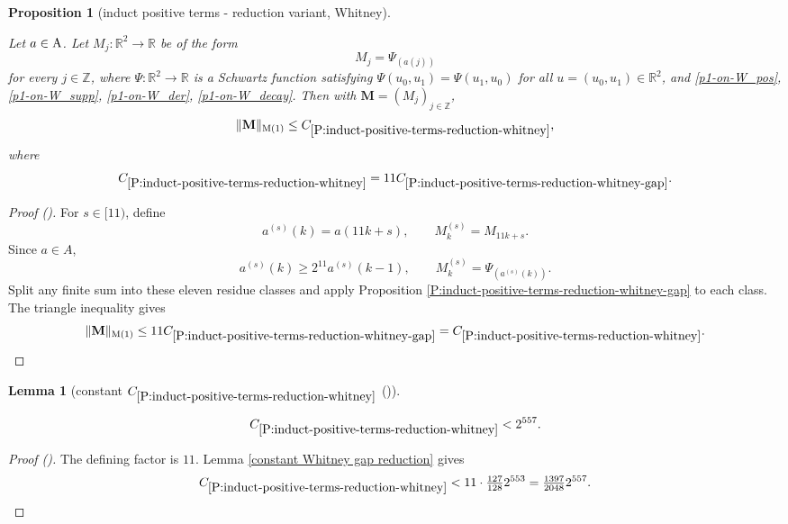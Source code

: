 \documentclass[12pt,reqno]{amsart}
\newcommand{\auto}{{({\tiny\faCar})}}
\theoremstyle{plain}
\newtheorem{lemma}[theorem]{Lemma}
\newtheorem{proposition}[theorem]{Proposition}
\numberwithin{equation}{section}
\theoremstyle{remark}
\newcommand{\uses}[1]{}
\newcommand{\usesdefs}[1]{}
\newcommand{\leanok}{}
\newcommand{\lean}[1]{}
\newcommand{\Z}{{\mathbb Z}}
\newcommand{\M}{\mathbf{M}}
\begin{document}
\begin{proposition}[induct positive terms - reduction variant, Whitney]
\label{P:induct-positive-terms-reduction-whitney}\uses{P:induct-positive-terms-reduction-whitney-gap}\usesdefs{bracket bump,multiplicatively spaced monotone sequences,auto:unitary-matrices-definition,kernel sequences}
\lean{Auto.inductPositiveTermsReductionWhitney}
\leanok
Let $a\in {\rm A}$. Let $M_j:\mathbb{R}^2\to \mathbb{R}$ be of the form
\begin{equation}\label{auto:Whitney-kernel}
M_j=\Psi_{(a(j))}
\end{equation}
for every $j\in\Z$, where $\Psi:\mathbb{R}^2\to \mathbb{R}$ is a Schwartz function satisfying $\Psi(u_0,u_1)=\Psi(u_1,u_0)$ for all $u=(u_0,u_1)\in\mathbb{R}^2$, and \eqref{p1-on-W_pos}, \eqref{p1-on-W_supp}, \eqref{p1-on-W_der}, \eqref{p1-on-W_decay}. Then with $\M=(M_j)_{j\in\Z}$,
\begin{equation}\label{auto:Whitney-reduction-bound}
\|\M\|_{\rm M(1)} \le C_{\ref{P:induct-positive-terms-reduction-whitney}},
\end{equation}
where
\begin{equation}\label{auto:Whitney-constant-definition}
C_{\ref{P:induct-positive-terms-reduction-whitney}}
=11C_{\ref{P:induct-positive-terms-reduction-whitney-gap}}.
\end{equation}
\end{proposition}

\begin{proof}[Proof \auto]
For $s\in[11)$, define
\[
a^{(s)}(k)=a(11k+s),
\qquad
M^{(s)}_k=M_{11k+s}.
\]
Since $a\in A$,
\[
a^{(s)}(k)\ge2^{11}a^{(s)}(k-1),
\qquad
M^{(s)}_k=\Psi_{(a^{(s)}(k))}.
\]
Split any finite sum into these eleven residue classes and apply Proposition \ref{P:induct-positive-terms-reduction-whitney-gap} to each class. The triangle inequality gives
\[
\|\M\|_{\rm M(1)}
\le11C_{\ref{P:induct-positive-terms-reduction-whitney-gap}}
= C_{\ref{P:induct-positive-terms-reduction-whitney}}.
\]
\end{proof}

\begin{lemma}[constant $C_{\ref{P:induct-positive-terms-reduction-whitney}}$ \auto]\label{constant Whitney reduction}\uses{constant Whitney gap reduction,P:induct-positive-terms-reduction-whitney}\usesdefs{}
\lean{Auto.constantWhitneyReduction}
\leanok
\begin{equation}\label{constant Whitney reduction bound}
C_{\ref{P:induct-positive-terms-reduction-whitney}}
<2^{557}.
\end{equation}
\end{lemma}
\begin{proof}[Proof \auto]
The defining factor is $11$. Lemma \ref{constant Whitney gap reduction} gives
\[
C_{\ref{P:induct-positive-terms-reduction-whitney}}
<11\cdot\tfrac{127}{128}2^{553}
=\tfrac{1397}{2048}2^{557}.
\]
\end{proof}
\end{document}
